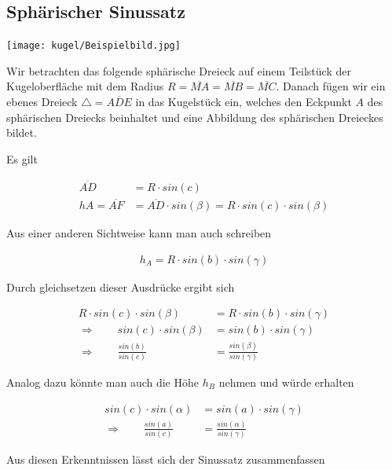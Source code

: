 \begin{refsection}
\subsection{Sphärischer Sinussatz}

\begin{center}
        \texttt{[image: kugel/Beispielbild.jpg]}
\end{center}


Wir betrachten das folgende sphärische Dreieck auf einem Teilstück der Kugeloberfläche mit dem Radius $R= \overline{MA} = \overline{MB} = \overline{MC}$. Danach fügen wir ein ebenes Dreieck $\triangle=\overline{ADE}$ in das Kugelstück ein, welches den Eckpunkt $A$ des sphärischen Dreiecks beinhaltet und eine Abbildung des sphärischen Dreieckes bildet.

Es gilt

\begin{align*}
\overline{AD} &= R \cdot sin (c) \\
hA = \overline{AF} &= \overline{AD} \cdot sin(\beta) = R \cdot sin(c) \cdot sin(\beta)  
\end{align*}

Aus einer anderen Sichtweise kann man auch schreiben

\begin{align*}
h_{A} = R \cdot sin(b) \cdot sin(\gamma)  
\end{align*}

Durch gleichsetzen dieser Ausdrücke ergibt sich

\begin{align*}
R \cdot sin(c) \cdot sin(\beta) &= R \cdot sin(b) \cdot sin(\gamma) \\
\Rightarrow \quad \quad
sin(c) \cdot sin(\beta) &= sin(b) \cdot sin(\gamma) \\
\Rightarrow \quad \quad
\frac{sin (b)}{sin (c)} &= \frac{sin (\beta)}{sin (\gamma)}
\end{align*}

Analog dazu könnte man auch die Höhe $h_{B}$ nehmen und würde erhalten

\begin{align*}
sin(c) \cdot sin(\alpha) &= sin(a) \cdot sin(\gamma) \\
\Rightarrow \quad \quad
\frac{sin (a)}{sin (c)} &= \frac{sin (\alpha)}{sin (\gamma)}
\end{align*}

Aus diesen Erkenntnissen lässt sich der Sinussatz zusammenfassen


\end{refsection}
